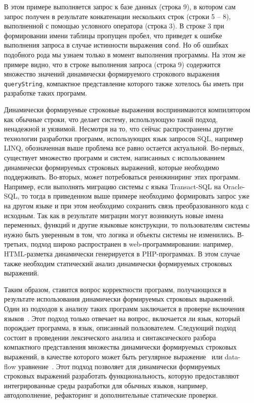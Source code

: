 В этом примере выполняется запрос к базе данных (строка 9), в котором сам запрос получен в результате конкатенации нескольких строк (строки 5 -- 8), выполненной с помощью условного оператора (строка 3). В строке 3 при формировании имени таблицы пропущен пробел, что приведет к ошибке выполнения запроса в случае истинности выражения \verb|cond|. Но об ошибках подобного рода мы узнаем только в момент выполнения программы. На этом же примере видно, что в строке выполнения запроса (строка 9) содержится множество значений динамически формируемого строкового выражения \verb|queryString|, компактное представление которого также хотелось бы иметь при разработке таких программ.

Динамически формируемые строковые выражения воспринимаются компилятором как обычные строки, что делает систему, использующую такой подход, ненадежной и уязвимой. Несмотря на то, что сейчас распространены другие технологии разработки программ, использующих язык запросов SQL, например LINQ, обозначенная выше проблема все равно остается актуальной. Во-первых, существует множество программ и систем, написанных с использованием динамически формируемых строковых выражений, которые необходимо поддерживать. Во-вторых, может потребоваться реинжиниринг этих программ. Например, если выполнять миграцию системы с языка Transact-SQL на Oracle-SQL, то тогда в приведенном выше примере необходимо формировать запрос уже на другом языке и при этом необходимо сохранить связь преобразованного кода с исходным. Так как в результате миграции  могут возникнуть новые имена переменных, функций и другие языковые конструкции, то пользователям системы нужно быть уверенным в том, что логика и объекты системы не изменились. В-третьих, подход широко распространен в web-программировании: например, HTML-разметка динамически генерируется в PHP-программах. В этом случае также необходим статический анализ динамически формируемых строковых выражений.    

Таким образом, ставится вопрос корректности программ, получающихся в результате использования динамически формируемых строковых выражений. Один из подходов к анализу таких программ заключается в проверке включения языков~\cite{JSA1, PHPSA}. Этот подход только отвечает на вопрос, включается ли язык, который порождает программа, в язык, описанный пользователем. Следующий подход состоит в проведении лексического анализа и синтаксического разбора компактного представления множества динамически формируемых строковых выражений, в качестве которого может быть регулярное выражение~\cite{Alvor1} или data-flow уравнение~\cite{Doh}. Этот подход позволяет для динамически формируемых строковых выражений разработать функциональность, которую предоставляют интегрированные среды разработки для обычных языков, например, автодополнение, рефакторинг и дополнительные статические проверки.

